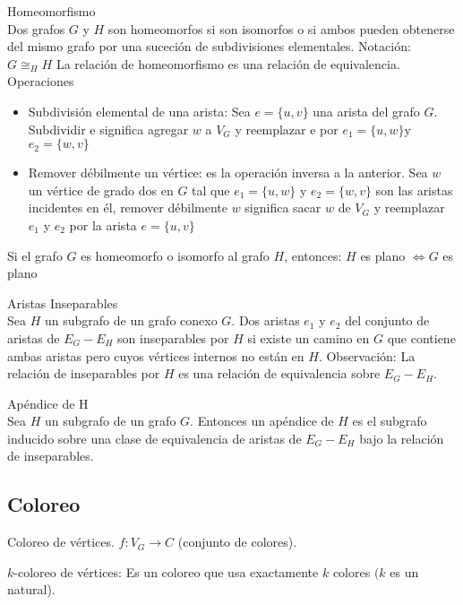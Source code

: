 \documentclass{article}
\begin{document}
\begin{defn}
Homeomorfismo \\
Dos grafos $G$ y $H$ son homeomorfos si son isomorfos o si ambos pueden obtenerse del mismo grafo por una suceción de subdivisiones elementales. Notación: $G \cong_{H} H$
La relación de homeomorfismo es una relación de equivalencia. \\
Operaciones
\begin{itemize}
    \item Subdivisión elemental de una arista: Sea $e=\{u, v\}$ una arista del grafo $G .$ Subdividir e significa agregar $w$ a $V_{G}$ y reemplazar e por $e_{1}=\{u, w\} \mathrm{y}$ $e_{2}=\{w, v\}$
    \item Remover débilmente un vértice: es la operación inversa a la anterior. Sea $w$ un vértice de grado dos en $G$ tal que $e_{1}=\{u, w\}$ y $e_{2}=\{w, v\}$ son las aristas incidentes en él, remover débilmente $w$ significa sacar $w$ de $V_{G}$ y reemplazar $e_{1}$ y $e_{2}$ por la arista $e=\{u, v\}$

\end{itemize}
Si el grafo $G$ es homeomorfo o isomorfo al grafo $H$, entonces:
$H$ es plano $\Leftrightarrow G$ es plano
\end{defn}

\begin{defn}
Aristas Inseparables \\
Sea $H$ un subgrafo de un grafo conexo $G .$ Dos aristas $e_{1}$ y $e_{2}$ del conjunto de aristas de $E_{G}-E_{H}$ son inseparables por $H$ si existe un camino en $G$ que contiene ambas aristas pero cuyos vértices internos no están en $H$.
Observación:
La relación de inseparables por $H$ es una relación de equivalencia sobre $E_{G}-E_{H}$.
\end{defn}

\begin{defn}
Apéndice de H \\ Sea $H$ un subgrafo de un grafo $G$. Entonces un apéndice de $H$ es el subgrafo inducido sobre una clase de equivalencia de aristas de $E_{G}-E_{H}$ bajo la relación de inseparables.
\end{defn}
 
\subsection{Coloreo}
Coloreo de vértices. $f: V_{G} \rightarrow C$ (conjunto de colores).

\begin{defn}
$k$-coloreo de vértices: Es un coloreo que usa exactamente $k$ colores $(k$ es un natural).
\end{defn}
\end{document}
